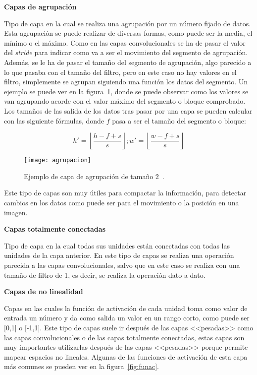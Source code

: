 \textbf{Capas de agrupación}

Tipo de capa en la cual se realiza una agrupación por un número fijado de datos. Esta agrupación se puede realizar de diversas formas, como puede ser la media, el mínimo o el máximo. Como en las capas convolucionales se ha de pasar el valor del \textit{stride} para indicar como va a ser el movimiento del segmento de agrupación. Además, se le ha de pasar el tamaño del segmento de agrupación, algo parecido a lo que pasaba con el tamaño del filtro, pero en este caso no hay valores en el filtro, simplemente se agrupan siguiendo una función los datos del segmento. Un ejemplo se puede ver en la figura~\ref{fig:agrupacion}, donde se puede observar como los valores se van agrupando acorde con el valor máximo del segmento o bloque comprobado. Los tamaños de las salida de los datos tras pasar por una capa se pueden calcular con las siguiente fórmulas, donde $f$ pasa a ser el tamaño del segmento o bloque:

\begin{equation}
h'=\left \lfloor \frac{h-f+s}{s} \right \rfloor;w'=\left \lfloor \frac{w-f+s}{s} \right \rfloor
\end{equation}

\begin{figure}[h]
	\centering
	\texttt{[image: agrupacion]}
	\caption{Ejemplo de capa de agrupación de tamaño 2~\cite{cnn}.}
	\label{fig:agrupacion}
\end{figure}

Este tipo de capas son muy útiles para compactar la información, para detectar cambios en los datos como puede ser para el movimiento o la posición en una imagen.

\textbf{Capas totalmente conectadas}

Tipo de capa en la cual todas sus unidades están conectadas con todas las unidades de la capa anterior. En este tipo de capas se realiza una operación parecida a las capas convolucionales, salvo que en este caso se realiza con una tamaño de filtro de 1, es decir, se realiza la operación dato a dato. 

\textbf{Capas de no linealidad}

Capas en las cuales la función de activación de cada unidad toma como valor de entrada un número y da como salida un valor en un rango corto, como puede ser [0,1] o [-1,1]. Este tipo de capas suele ir después de las capas <<pesadas>> como las capas convolucionales o de las capas totalmente conectadas, estas capas son muy importantes utilizarlas después de las capas <<pesadas>> porque permite mapear espacios no lineales. Algunas de las funciones de activación de esta capa más comunes se pueden ver en la figura~\ref{fig:funac}.

